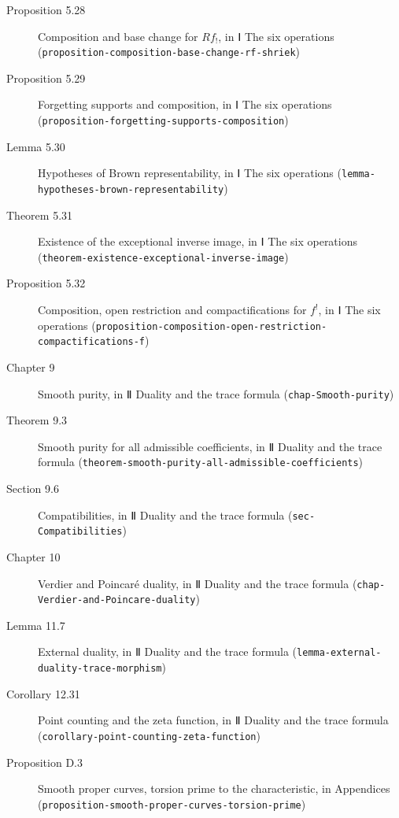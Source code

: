 \documentclass[11pt]{article}
\newcommand{\bpslug}[1]{\texttt{#1}}
\begin{document}
\begin{description}
\item[Proposition 5.28] Composition and base change for $Rf_!$, in Ⅰ The six operations (\bpslug{proposition-{}\allowbreak{}composition-{}\allowbreak{}base-{}\allowbreak{}change-{}\allowbreak{}rf-{}\allowbreak{}shriek})
\item[Proposition 5.29] Forgetting supports and composition, in Ⅰ The six operations (\bpslug{proposition-{}\allowbreak{}forgetting-{}\allowbreak{}supports-{}\allowbreak{}composition})
\item[Lemma 5.30] Hypotheses of Brown representability, in Ⅰ The six operations (\bpslug{lemma-{}\allowbreak{}hypotheses-{}\allowbreak{}brown-{}\allowbreak{}representability})
\item[Theorem 5.31] Existence of the exceptional inverse image, in Ⅰ The six operations (\bpslug{theorem-{}\allowbreak{}existence-{}\allowbreak{}exceptional-{}\allowbreak{}inverse-{}\allowbreak{}image})
\item[Proposition 5.32] Composition, open restriction and compactifications for $f^!$, in Ⅰ The six operations (\bpslug{proposition-{}\allowbreak{}composition-{}\allowbreak{}open-{}\allowbreak{}restriction-{}\allowbreak{}compactifications-{}\allowbreak{}f})
\item[Chapter 9] Smooth purity, in Ⅱ Duality and the trace formula (\bpslug{chap-{}\allowbreak{}Smooth-{}\allowbreak{}purity})
\item[Theorem 9.3] Smooth purity for all admissible coefficients, in Ⅱ Duality and the trace formula (\bpslug{theorem-{}\allowbreak{}smooth-{}\allowbreak{}purity-{}\allowbreak{}all-{}\allowbreak{}admissible-{}\allowbreak{}coefficients})
\item[Section 9.6] Compatibilities, in Ⅱ Duality and the trace formula (\bpslug{sec-{}\allowbreak{}Compatibilities})
\item[Chapter 10] Verdier and Poincaré duality, in Ⅱ Duality and the trace formula (\bpslug{chap-{}\allowbreak{}Verdier-{}\allowbreak{}and-{}\allowbreak{}Poincare-{}\allowbreak{}duality})
\item[Lemma 11.7] External duality, in Ⅱ Duality and the trace formula (\bpslug{lemma-{}\allowbreak{}external-{}\allowbreak{}duality-{}\allowbreak{}trace-{}\allowbreak{}morphism})
\item[Corollary 12.31] Point counting and the zeta function, in Ⅱ Duality and the trace formula (\bpslug{corollary-{}\allowbreak{}point-{}\allowbreak{}counting-{}\allowbreak{}zeta-{}\allowbreak{}function})
\item[Proposition D.3] Smooth proper curves, torsion prime to the characteristic, in Appendices (\bpslug{proposition-{}\allowbreak{}smooth-{}\allowbreak{}proper-{}\allowbreak{}curves-{}\allowbreak{}torsion-{}\allowbreak{}prime})
\end{description}
\clearpage{}%
\end{document}
